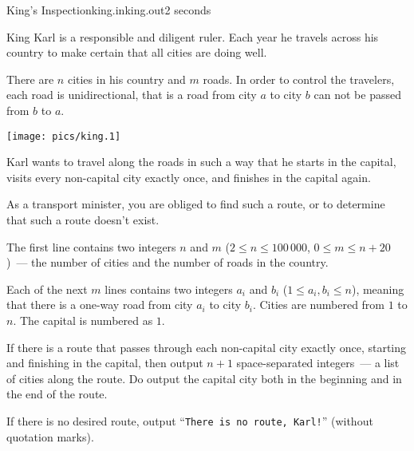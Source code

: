 \begin{problem}{King's Inspection}{king.in}{king.out}{2 seconds}


King Karl is a responsible and diligent ruler. Each year he travels across his country
to make certain that all cities are doing well.

There are $n$ cities in his country and $m$ roads. In order to control the travelers,
each road is unidirectional, that is a road from city $a$ to city $b$ can not be passed
from $b$ to $a$.

\begin{center}
\texttt{[image: pics/king.1]}
\end{center}

Karl wants to travel along the roads in such a way that he starts in the capital,
visits every non-capital city exactly once, and finishes in the capital again.

As a transport minister, you are obliged to find such a route, or to determine
that such a route doesn't exist.

\InputFile

The first line contains two integers $n$ and $m$ ($2 \le n \le 100\,000$,
$0 \le m \le n + 20$)~--- the number of cities and the number of roads in the country.

Each of the next $m$ lines contains two integers $a_i$ and $b_i$
($1 \le a_i, b_i \le n$),
meaning that there is a one-way road from city $a_i$ to city $b_i$.
Cities are numbered from $1$ to $n$. The capital is numbered as $1$.

\OutputFile

If there is a route that passes through each non-capital city exactly once, 
starting and finishing in the capital, then
output $n+1$ space-separated integers~--- a list of cities along the route.
Do output the capital city both in the beginning and in the end of the route.

If there is no desired route, output ``\texttt{There is no route, Karl!}'' (without quotation marks).

\Example

\begin{example}
%
%
\end{example}

\end{problem}
